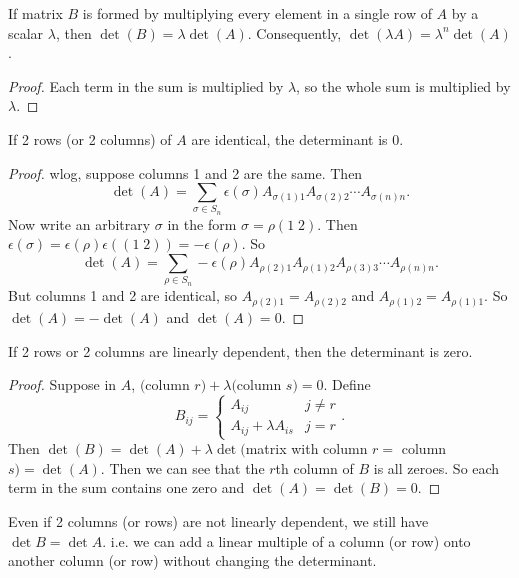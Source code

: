 \documentclass[a4paper]{article}
\begin{document}
\begin{prop}
  If matrix $B$ is formed by multiplying every element in a single row of $A$ by a scalar $\lambda$, then $\det (B) = \lambda \det (A)$. Consequently, $\det (\lambda A) = \lambda^n \det(A)$.
\end{prop}

\begin{proof}
  Each term in the sum is multiplied by $\lambda$, so the whole sum is multiplied by $\lambda$.
\end{proof}

\begin{prop}
  If 2 rows (or 2 columns) of $A$ are identical, the determinant is $0$.
\end{prop}

\begin{proof}
  wlog, suppose columns 1 and 2 are the same. Then
  \[
  \det (A) = \sum_{\sigma\in S_n} \epsilon(\sigma) A_{\sigma(1)1}A_{\sigma(2)2}\cdots A_{\sigma(n)n}.
  \]
  Now write an arbitrary $\sigma$ in the form $\sigma = \rho(1\; 2)$. Then $\epsilon(\sigma) = \epsilon(\rho)\epsilon((1\; 2)) = -\epsilon(\rho)$. So
  \[
  \det (A) = \sum_{\rho\in S_n} -\epsilon(\rho) A_{\rho(2)1}A_{\rho(1)2}A_{\rho(3)3}\cdots A_{\rho(n)n}.
  \]
  But columns 1 and 2 are identical, so $A_{\rho(2)1} = A_{\rho(2)2}$ and $A_{\rho(1)2} = A_{\rho(1)1}$. So $\det (A) = -\det (A)$ and $\det(A) = 0$.
\end{proof}

\begin{prop}
  If 2 rows or 2 columns are linearly dependent, then the determinant is zero.
\end{prop}

\begin{proof}
  Suppose in $A$, $($column $r) + \lambda($column $s) = 0$. Define
  \[
  B_{ij} =
  \begin{cases}
    A_{ij} & j\not= r\\
    A_{ij} + \lambda A_{is} & j = r
  \end{cases}.
  \]
  Then $\det (B) = \det(A) + \lambda \det($matrix with column $r =$ column $s) = \det(A)$. Then we can see that the $r$th column of $B$ is all zeroes. So each term in the sum contains one zero and $\det (A) = \det (B) = 0$.
\end{proof}
\note Even if 2 columns (or rows) are not linearly dependent, we still have $\det B = \det A$. i.e. we can add a linear multiple of a column (or row) onto another column (or row) without changing the determinant.
\end{document}

